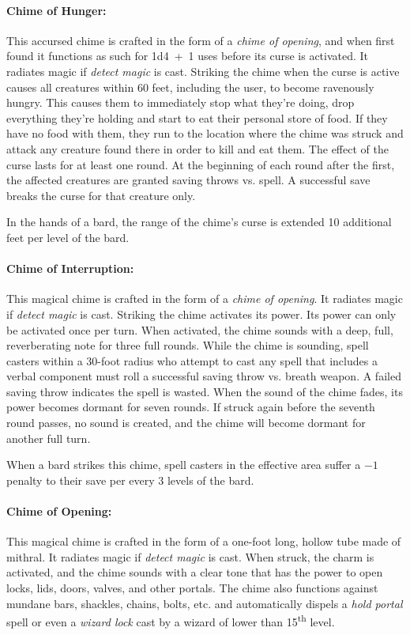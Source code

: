 \begin{multicols}{2}
\begin{minipage}{\columnwidth}
\end{minipage}

\paragraph{Chime of Hunger:} This accursed chime is crafted in the form of a \textit{chime of opening}, and when first found it functions as such for 1d4~+~1 uses before its curse is activated.  It radiates magic if \textit{detect magic} is cast.  Striking the chime when the curse is active causes all creatures within 60 feet, including the user, to become ravenously hungry.  This causes them to immediately stop what they're doing, drop everything they're holding and start to eat their personal store of food.  If they have no food with them, they run to the location where the chime was struck and attack any creature found there in order to kill and eat them.  The effect of the curse lasts for at least one round.  At the beginning of each round after the first, the affected creatures are granted saving throws vs. spell.  A successful save breaks the curse for that creature only.  

In the hands of a bard, the range of the chime's curse is extended 10 additional feet per level of the bard.

\paragraph{Chime of Interruption:} This magical chime is crafted in the form of a \textit{chime of opening}.  It radiates magic if \textit{detect magic} is cast.  Striking the chime activates its power.  Its power can only be activated once per turn.  When activated, the chime sounds with a deep, full, reverberating note for three full rounds.  While the chime is sounding, spell casters within a 30-foot radius who attempt to cast any spell that includes a verbal component must roll a successful saving throw vs. breath weapon.  A failed saving throw indicates the spell is wasted.  When the sound of the chime fades, its power becomes dormant for seven rounds.  If struck again before the seventh round passes, no sound is created, and the chime will become dormant for another full turn.

When a bard strikes this chime, spell casters in the effective area suffer a $-1$ penalty to their save per every 3 levels of the bard.  

\paragraph{Chime of Opening:} This magical chime is crafted in the form of a one-foot long, hollow tube made of mithral.  It radiates magic if \textit{detect magic} is cast.  When struck, the charm is activated, and the chime sounds with a clear tone that has the power to open locks, lids, doors, valves, and other portals.  The chime also functions against mundane bars, shackles, chains, bolts, etc. and automatically dispels a \textit{hold portal} spell or even a \textit{wizard lock} cast by a wizard of lower than 15\textsuperscript{th} level. 


\end{multicols}
